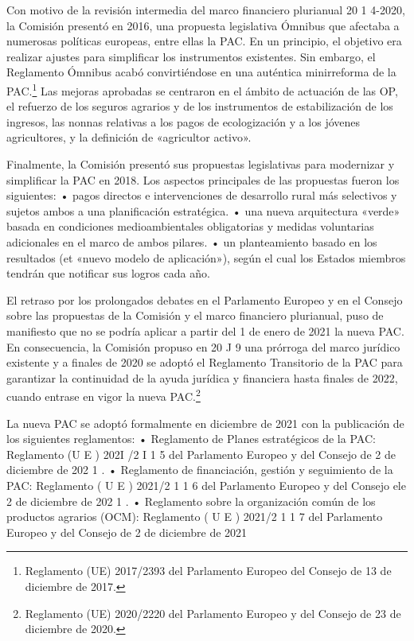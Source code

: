 \documentclass[10pt,a4paper]{article}
\begin{document}
Con motivo de la revisión intermedia del marco financiero plurianual 20 1 4-2020, la Comisión presentó en 2016, una propuesta legislativa Ómnibus que afectaba a numerosas políticas europeas, entre ellas la PAC. En un principio, el objetivo era realizar ajustes para simplificar los instrumentos existentes. Sin embargo, el Reglamento Ómnibus acabó convirtiéndose en una auténtica minirreforma de la PAC.\footnote{%
    Reglamento (UE) 2017/2393 del Parlamento Europeo del Consejo de 13 de diciembre de 2017.
} Las mejoras aprobadas se centraron en el ámbito de actuación de las OP, el refuerzo de los seguros agrarios y de los instrumentos de estabilización de los ingresos, las nonnas relativas a los pagos de ecologización y a los jóvenes agricultores, y la definición de «agricultor activo». 

Finalmente, la Comisión presentó sus propuestas legislativas para modernizar y simplificar la PAC en 2018. Los aspectos principales de las propuestas fueron los siguientes:
• pagos directos e intervenciones de desarrollo rural más selectivos y sujetos ambos a una planificación estratégica.
• una nueva arquitectura «verde» basada en condiciones medioambientales obligatorias y medidas voluntarias adicionales en el marco de ambos pilares.
• un planteamiento basado en los resultados (et «nuevo modelo de aplicación»), según el cual los Estados miembros tendrán que notificar sus logros cada año.

El retraso por los prolongados debates en el Parlamento Europeo y en el Consejo sobre las propuestas de la Comisión y el marco financiero plurianual, puso de manifiesto que no se podría aplicar a partir del 1 de enero de 2021 la nueva PAC. En consecuencia, la Comisión propuso en 20 J 9 una prórroga del marco jurídico existente y a finales de 2020 se adoptó el Reglamento Transitorio de la PAC  para garantizar la continuidad de la ayuda jurídica y financiera hasta finales de 2022, cuando entrase en vigor la nueva PAC.\footnote{%
    Reglamento (UE) 2020/2220 del Parlamento Europeo y del Consejo de 23 de diciembre de 2020.
}

La nueva PAC se adoptó formalmente en diciembre de 2021 con la publicación de los siguientes reglamentos:
• Reglamento de Planes estratégicos de la PAC: Reglamento (U E ) 202I /2 I 1 5 del Parlamento Europeo y del Consejo de 2 de diciembre de 202 1 .
• Reglamento de financiación, gestión y seguimiento de la PAC: Reglamento ( U E ) 2021/2 1 1 6 del Parlamento Europeo y del Consejo ele 2 de diciembre de 202 1 .
• Reglamento sobre la organización común de los productos agrarios (OCM): Reglamento ( U E ) 2021/2 1 1 7 del Parlamento Europeo y del Consejo de 2 de diciembre de 2021
\end{document}
